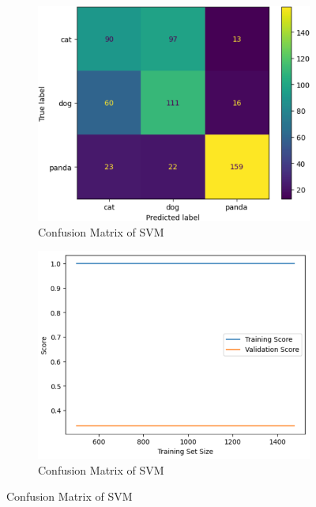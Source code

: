 \begin{figure}[h]
    \begin{subfigure}{0.4\textwidth}
        \centering
        \includegraphics[scale=0.5]{csvm_cfm}
        \caption{Confusion Matrix of SVM}
        \label{fig:figure3}
    \end{subfigure}
    \hspace{0.2\textwidth}
	\begin{subfigure}{0.4\textwidth}
        \centering
        \includegraphics[scale=0.5]{svm_overfit}
        \caption{Confusion Matrix of SVM}
        \label{fig:figure19}
    \end{subfigure}
\end{figure}

